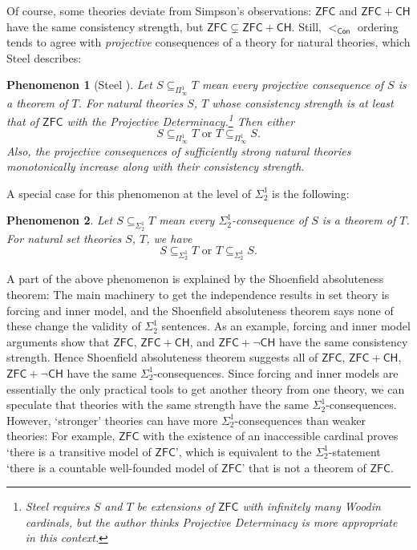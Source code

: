 \documentclass{mhkr}
\newcommand{\added}[1]{#1}
\newtheorem{phenomenon}[phenomenon]{Phenomenon}
\newcommand{\Con}{\mathsf{Con}}
\newcommand{\ZFC}{\mathsf{ZFC}}
\newcommand{\CH}{\mathsf{CH}}
\begin{document}
Of course, \added{some theories deviate from Simpson's observations:} $\ZFC$ and $\ZFC+\mathsf{CH}$ have the same consistency strength, but $\ZFC \subsetneq \ZFC + \mathsf{CH}$.
Still, $<_\Con$ ordering \added{tends to agree with} \emph{projective} consequences of a theory \added{for natural theories}, which Steel describes:
\begin{phenomenon}[Steel {\cite[p.159]{Steel2014GodelProgram}}] \label{Phenomenon: SteelObservation}
    Let $S \subseteq_{\Pi^1_\infty} T$ mean every projective consequence of $S$ is a theorem of $T$.
    For natural theories $S$, $T$ whose consistency strength is at least that of $\ZFC$ with the Projective Determinacy.\footnote{\added{Steel requires $S$ and $T$ be extensions of $\ZFC$ with infinitely many Woodin cardinals, but the author thinks Projective Determinacy is more appropriate in this context.}} Then either
    \begin{equation*}
        S \subseteq_{\Pi^1_\infty} T \text{ or } T \subseteq_{\Pi^1_\infty} S.
    \end{equation*}
    Also, the projective consequences of sufficiently strong natural theories monotonically increase along with their consistency strength.
\end{phenomenon}

A special case for this phenomenon at the level of $\Sigma^1_2$ is the following:
\begin{phenomenon} \label{Phenomenon: Sigma 1 2 observation}
    Let $S\subseteq_{\Sigma^1_2} T$ mean every $\Sigma^1_2$-consequence of $S$ is a theorem of $T$. For natural \added{set} theories $S$, $T$, we have
    \begin{equation*}
        S \subseteq_{\Sigma^1_2} T \text{ or } T \subseteq_{\Sigma^1_2} S.
    \end{equation*}
\end{phenomenon}

A part of the above phenomenon \added{is explained} by the Shoenfield absoluteness theorem: The main machinery to get the independence results in set theory is forcing and inner model, and the Shoenfield absoluteness theorem says none of these change the validity of $\Sigma^1_2$ sentences. 
As an example, forcing and inner model arguments show that $\ZFC$, $\ZFC+\CH$, and $\ZFC+\lnot\CH$ have the same consistency strength. Hence Shoenfield absoluteness theorem suggests all of $\ZFC$, $\ZFC+\CH$, $\ZFC+\lnot\CH$ have the same $\Sigma^1_2$-consequences. Since forcing and inner models are essentially the only practical tools to get another theory from one theory, we can speculate that theories with the same strength have the same $\Sigma^1_2$-consequences.
However, `stronger' theories can have more $\Sigma^1_2$-consequences than weaker theories: For example, $\ZFC$ with the existence of an inaccessible cardinal proves `there is a transitive model of $\ZFC$', which is equivalent to the $\Sigma^1_2$-statement `there is a countable well-founded model of $\ZFC$' that is not a theorem of $\ZFC$.
\end{document}
